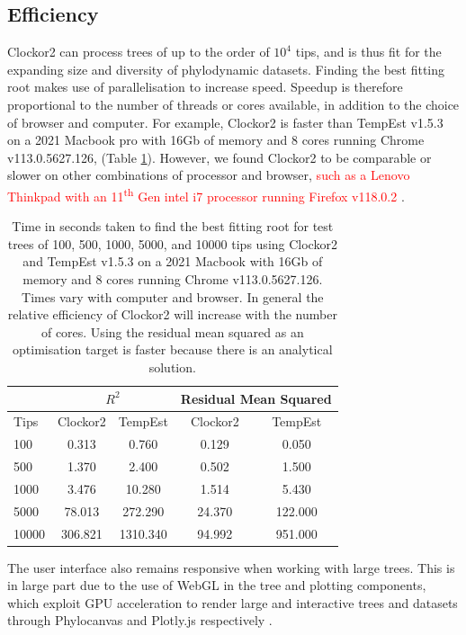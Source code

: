 \documentclass{article}
\begin{document}
\subsection*{Efficiency}
Clockor2 can process trees of up to the order of $10^4$ tips, and is thus fit for the expanding size and diversity of phylodynamic datasets. Finding the best fitting root makes use of parallelisation to increase speed. Speedup is therefore proportional to the number of threads or cores available, in addition to the choice of browser and computer. For example, Clockor2 is faster than TempEst v1.5.3 on a 2021 Macbook pro with 16Gb of memory and 8 cores running Chrome v113.0.5627.126, (Table \ref{tab:bfr}). However, we found Clockor2 to be comparable or slower on other combinations of processor and browser, \textcolor{red}{such as a Lenovo Thinkpad with an 11\textsuperscript{th} Gen intel i7 processor running Firefox v118.0.2 }. 
\begin{table}[H]
    \centering
    \caption{Time in seconds taken to find the best fitting root for test trees of 100, 500, 1000, 5000, and 10000 tips using Clockor2 and TempEst v1.5.3 on a 2021 Macbook with 16Gb of memory and 8 cores running Chrome v113.0.5627.126. Times vary with computer and browser. In general the relative efficiency of Clockor2 will increase with the number of cores. Using the residual mean squared as an optimisation target is faster because there is an analytical solution.}
    \begin{tabular}{|l|c|c|c|c|}
    		\cline{2-5}
    		\multicolumn{1}{c}{}		 & \multicolumn{2}{|c|}{$R^{2}$} & \multicolumn{2}{|c|}{Residual Mean Squared}  \\
    		\hline
        Tips    & Clockor2  & TempEst & Clockor2  & TempEst   \\
        \hline
        100  & 0.313 & 0.760 & 0.129 & 0.050 \\
        500  & 1.370 & 2.400 & 0.502 & 1.500 \\
        1000  & 3.476 & 10.280 & 1.514 & 5.430 \\
        5000 & 78.013 & 272.290 & 24.370 & 122.000 \\
        10000  & 306.821 & 1310.340 & 94.992 & 951.000 \\
        \hline
    \end{tabular}
    \label{tab:bfr}
\end{table}

The user interface also remains responsive when working with large trees. This is in large part due to the use of WebGL in the tree and plotting components, which exploit GPU acceleration to render large and interactive trees and datasets through Phylocanvas and Plotly.js respectively \citep{abudahab_phylocanvasgl_2021,plotly}.
\end{document}
